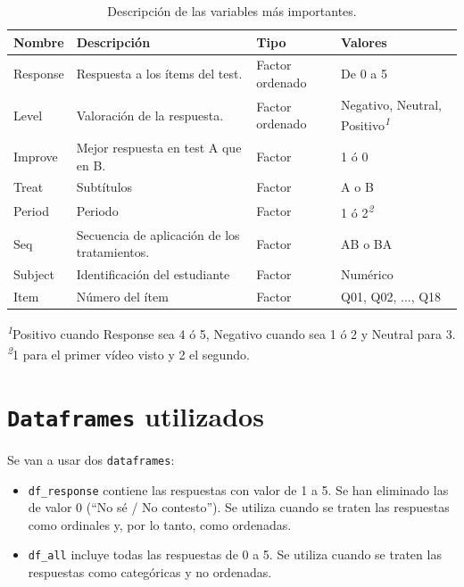 \documentclass[
  12pt,
  a4paper,
  extrafontsizes,
  onecolumn,
  openright,
  table]{memoir}
\providecommand{\tightlist}{%
  \setlength{\itemsep}{0pt}\setlength{\parskip}{0pt}}\usepackage{longtable,booktabs,array}
\begin{document}
\footnotesize

\hypertarget{tbl-variables}{}
\setlength{\LTpost}{0mm}
\begin{longtable}{llll}
\caption{\label{tbl-variables}Descripción de las variables más importantes. }\tabularnewline

\toprule
Nombre & Descripción & Tipo & Valores \\ 
\midrule
Response & Respuesta a los ítems del test. & Factor ordenado & De 0 a 5 \\ 
Level & Valoración de la respuesta. & Factor ordenado & Negativo, Neutral, Positivo\textsuperscript{\textit{1}} \\ 
Improve & Mejor respuesta en test A que en B. & Factor & 1 ó 0 \\ 
Treat & Subtítulos & Factor & A o B \\ 
Period & Periodo & Factor & 1 ó 2\textsuperscript{\textit{2}} \\ 
Seq & Secuencia de aplicación de los tratamientos. & Factor & AB o BA \\ 
Subject & Identificación del estudiante & Factor & Numérico \\ 
Item & Número del ítem & Factor & Q01, Q02, ..., Q18 \\ 
\bottomrule
\end{longtable}
\begin{minipage}{\linewidth}
\textsuperscript{\textit{1}}Positivo cuando Response sea 4 ó 5, Negativo cuando sea 1 ó 2 y Neutral para 3.\\
\textsuperscript{\textit{2}}1 para el primer vídeo visto y 2 el segundo.\\
\end{minipage}

\normalsize

\hypertarget{dataframes-utilizados}{%
\section{\texorpdfstring{\texttt{Dataframes}
utilizados}{Dataframes utilizados}}\label{dataframes-utilizados}}

Se van a usar dos \texttt{dataframes}:

\begin{itemize}
\tightlist
\item
  \texttt{df\_response} contiene las respuestas con valor de 1 a 5. Se
  han eliminado las de valor 0 (\enquote{No sé / No contesto}). Se
  utiliza cuando se traten las respuestas como ordinales y, por lo
  tanto, como ordenadas.
\item
  \texttt{df\_all} incluye todas las respuestas de 0 a 5. Se utiliza
  cuando se traten las respuestas como categóricas y no ordenadas.
\end{itemize}
\end{document}
